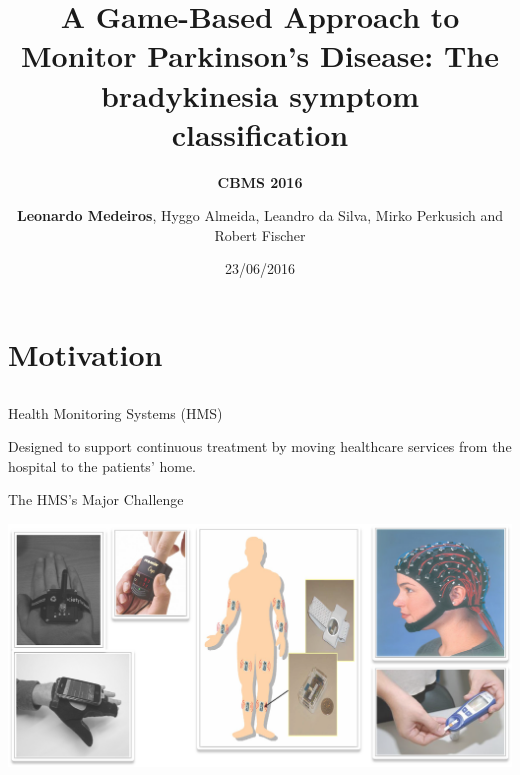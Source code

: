 \documentclass{beamer}
\author[]{\textbf{Leonardo Medeiros}, Hyggo Almeida, Leandro da Silva, Mirko Perkusich and Robert Fischer}
\date{23/06/2016}
\institute[]{Federal University Of Campina Grande - BRAZIL
}
\title{A Game-Based Approach to Monitor Parkinson's Disease: The bradykinesia symptom classification}
\subtitle{\textbf{CBMS 2016}}
\begin{document}
\begin{frame}
  \titlepage
\end{frame}

{
}






\section{Motivation}
\subsection{}
\begin{frame}{Health Monitoring Systems (HMS)}
  \begin{block}{}
Designed to support continuous treatment by moving healthcare services from the hospital to the patients' home. 
  \end{block} 
\end{frame}

\begin{frame}{The HMS's Major Challenge}
  \begin{block}{}
  \center
      \includegraphics[height=1.8 in]{img/sismonsaude.png}
  \end{block}  
\end{frame}
\end{document}
